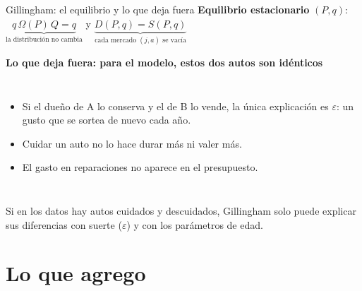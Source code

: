 \documentclass[aspectratio=169,11pt]{beamer}
\newcommand{\idea}[1]{\vspace{-0.3em}\begin{block}{}\centering\small #1\end{block}}
\begin{document}
\begin{frame}{Gillingham: el equilibrio y lo que deja fuera}
  \textbf{Equilibrio estacionario} $(P,q)$: \;
  $\underbrace{q\,\Omega(P)\,Q = q}_{\text{la distribución no cambia}}$
  \quad y \quad
  $\underbrace{D(P,q)=S(P,q)}_{\text{cada mercado }(j,a)\text{ se vacía}}$
  \par\bigskip
  \textbf{Lo que deja fuera: para el modelo, estos dos autos son idénticos}
  \par\smallskip
  \begin{columns}[c]
    \centering
    \begin{itemize}\small
      \item Si el dueño de A lo conserva y el de B lo vende, la única explicación es
            $\varepsilon$: un gusto que se sortea de nuevo cada año.
      \item Cuidar un auto no lo hace durar más ni valer más.
      \item El gasto en reparaciones no aparece en el presupuesto.
    \end{itemize}
  \end{columns}
  \idea{Si en los datos hay autos cuidados y descuidados, Gillingham solo puede explicar
  sus diferencias con suerte ($\varepsilon$) y con los parámetros de edad.}
\end{frame}

\section{Lo que agrego}
\end{document}
